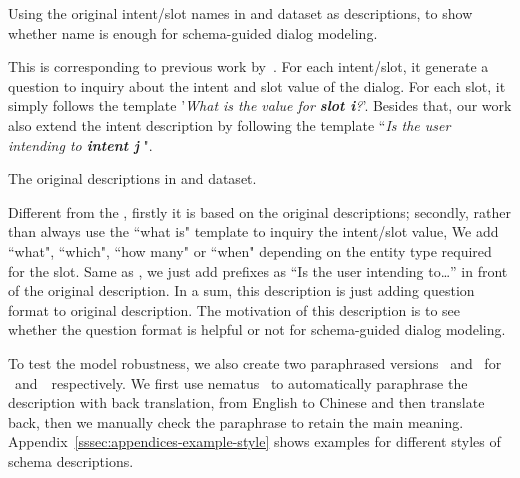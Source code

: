 \Paragraph{\NAMEONLY} Using the original intent/slot names in \sgdst
and \multiwoz dataset as descriptions, to show whether name is enough
for schema-guided dialog modeling.

\Paragraph{\QANAMEONLY} This is corresponding to previous
  work by~\citet{gao2019dialog}. For each intent/slot, it generate a
  question to inquiry about the intent and slot value of the
  dialog. For each slot, it simply follows the template '{\it What
    is the value for {\bf slot i}?}'. Besides that, our work also
  extend the intent description by following the template ``{\it Is
    the user intending to {\bf intent j} }".

  \Paragraph{\ORIGIN} The original descriptions in \sgdst and \multiwoz dataset.

  \Paragraph{\QARICH} Different from the \QANAMEONLY, firstly it is
  based on the original descriptions; secondly, rather than always use
  the ``what is" template to inquiry the intent/slot value, We add
  ``what", ``which", ``how many" or ``when" depending on the entity
  type required for the slot.  Same as \QANAMEONLY, we just add
  prefixes as ``Is the user intending to\ldots'' in front of the original
  description. In a sum, this description is just adding question
  format to original description. The motivation of this description is
  to see whether the question format is helpful or not for
  schema-guided dialog modeling.

  To test the model robustness, we also create two paraphrased versions
  \NAMEPARA~and \PARAPHRASE~for \NAMEONLY~and~\ORIGIN~respectively. We
  first use nematus~\cite{sennrich-etal-2017-nematus} to automatically
  paraphrase the description with back translation, from English to
  Chinese and then translate back, then we manually check the
  paraphrase to retain the main
  meaning. Appendix~\ref{sssec:appendices-example-style} shows examples for
  different styles of schema descriptions.

%


